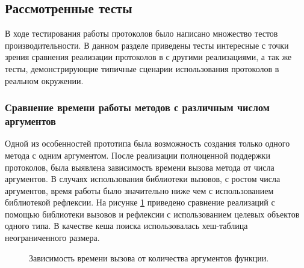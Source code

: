 \subsection{Рассмотренные тесты}
В ходе тестирования работы протоколов было написано множество тестов производительности. В данном разделе приведены тесты интересные с точки зрения сравнения реализации протоколов в  с другими реализациями, а так же тесты, демонстрирующие типичные сценарии использования протоколов в реальном окружении.

\subsubsection{Сравнение времени работы методов с различным числом аргументов}
Одной из особенностей прототипа была возможность создания только одного метода с одним аргументом. После реализации полноценной поддержки протоколов, была выявлена зависимость времени вызова метода от числа аргументов. В случаях использования библиотеки вызовов, с ростом числа аргументов, время работы было значительно ниже чем с использованием библиотекой рефлексии. На рисунке \ref{plot:bench:argsCount} приведено сравнение реализаций с помощью библиотеки вызовов и рефлексии с использованием целевых объектов одного типа. В качестве кеша поиска использовалась хеш-таблица неограниченного размера.

\begin{figure}[H]
\caption{\label{plot:bench:argsCount}Зависимость времени вызова от количества аргументов функции.}
\end{figure}

